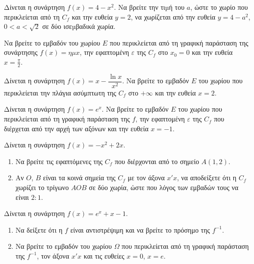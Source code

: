 \documentclass{../presentation}
\begin{document}
\begin{askisi}
  Δίνεται η συνάρτηση $f(x)=4-x^2$. Να βρείτε την τιµή του $a$, ώστε το χωρίο που περικλείεται από τη $C_f$ και την ευθεία $y=2$, να χωρίζεται από την ευθεία $y=4-a^2$, $0<a<\sqrt{2}$ σε δύο ισεµβαδικά χωρία.
\end{askisi}

\begin{askisi}
  Να βρείτε το εμβαδόν του χωρίου $E$ που περικλείεται από τη γραφική παράσταση της συνάρτησης $f(x)=ημx$, την εφαπτομένη $ε$ της $C_f$ στο $x_0=0$ και την ευθεία $x=\frac{π}{2}$.
\end{askisi}

\begin{askisi}
  Δίνεται η συνάρτηση $f(x)=x- \dfrac{\ln x}{x^2}$. Να βρείτε το εμβαδόν $E$ του χωρίου που περικλείεται την πλάγια ασύμπτωτη της $C_f$ στο $+\infty$ και την ευθεία $x=2$.
\end{askisi}

\begin{askisi}
  Δίνεται η συνάρτηση $f(x)=e^x$. Να βρείτε το εμβαδόν $E$ του χωρίου που περικλείεται από τη γραφική παράσταση της $f$, την εφαπτομένη $ε$ της $C_f$ που διέρχεται από την αρχή των αξόνων και την ευθεία $x=-1$.
\end{askisi}

\begin{askisi}
  Δίνεται η συνάρτηση $f(x) = -x^2 + 2x$.
  \begin{enumerate}[<+->]
    \item Να βρείτε τις εφαπτόμενες της $C_f$ που διέρχονται από το σημείο $A(1, 2)$.
    \item Αν $O$, $Β$ είναι τα κοινά σημεία της $C_f$ με τον άξονα $x'x$, να αποδείξετε ότι η $C_f$ χωρίζει το τρίγωνο $AOB$ σε δύο χωρία, ώστε που λόγος των εμβαδών τους να είναι $2:1$.
  \end{enumerate}
\end{askisi}

\begin{askisi}
  Δίνεται η συνάρτηση $f(x) = e^x +x- 1$.
  \begin{enumerate}[<+->]
    \item Να δείξετε ότι η $f$ είναι αντιστρέψιμη και να βρείτε το πρόσημο της $f^{-1}$.
    \item Να βρείτε το εμβαδόν του χωρίου $Ω$ που περικλείεται από τη γραφική παράσταση της $f^{-1}$, τον άξονα $x'x$ και τις ευθείες $x=0$, $x=e$.
  \end{enumerate}
\end{askisi}
\end{document}
